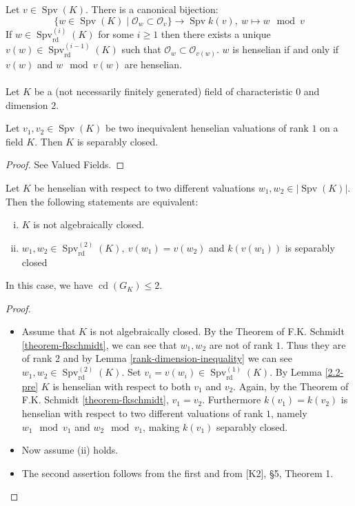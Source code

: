 \begin{lemma}\label{2.2-pre}
Let $v\in\operatorname{Spv}(K)$. There is a canonical bijection:
\[\{ w\in\operatorname{Spv}(K)\mid \mathcal{O}_w\subset\mathcal{O}_v \} \to \operatorname{Spv}k(v),\ w\mapsto w\mod v\]
If $w\in\operatorname{Spv}_\text{rd}^{(i)}(K)$ for some $i\geq 1$ then there exists a unique $v(w)\in\operatorname{Spv}_\text{rd}^{(i-1)}(K)$ such that $\mathcal{O}_w\subset\mathcal{O}_{v(w)}$. $w$ is henselian if and only if $v(w)$ and $w\mod v(w)$ are henselian.
\end{lemma}

\paragraph{} Let $K$ be a (not necessarily finitely generated) field of characteristic $0$ and dimension $2$.

\begin{theorem}\label{theorem-fkschmidt}
Let $v_1,v_2\in\operatorname{Spv}(K)$ be two inequivalent henselian valuations of rank $1$ on a field $K$. Then $K$ is separably closed.
\end{theorem}

\begin{proof}
See Valued Fields.
\end{proof}

\begin{lemma}\label{2.2}
Let $K$ be henselian with respect to two different valuations $w_1,w_2\in |\operatorname{Spv}(K)|$. Then the following statements are equivalent: 
\begin{enumerate}[(i)]
\item $K$ is not algebraically closed.
\item $w_1,w_2\in\operatorname{Spv}_\text{rd}^{(2)}(K),\ v(w_1)=v(w_2)$ and $k(v(w_1))$ is separably closed
\end{enumerate}
In this case, we have $\operatorname{cd}(G_K)\leq 2$.
\end{lemma}

\begin{proof}
\begin{itemize}
\item Assume that $K$ is not algebraically closed. By the Theorem of F.K. Schmidt \ref{theorem-fkschmidt}, we can see that $w_1,w_2$ are not of rank $1$. Thus they are of rank $2$ and by Lemma \ref{rank-dimension-inequality} we can see $w_1,w_2\in\operatorname{Spv}_\text{rd}^{(2)}(K)$. Set $v_i=v(w_i)\in\operatorname{Spv}^{(1)}_\text{rd}(K)$. By Lemma \ref{2.2-pre} $K$ is henselian with respect to both $v_1$ and $v_2$. Again, by the Theorem of F.K. Schmidt \ref{theorem-fkschmidt}, $v_1 = v_2$. Furthermore $k(v_1) = k(v_2)$ is henselian with respect to two different valuations of rank $1$, namely $w_1\mod v_1$ and $w_2\mod v_1$, making $k(v_1)$ separably closed.
\item Now assume (ii) holds.
\item The second assertion follows from the first and from [K2], §5, Theorem 1.\qedhere
\end{itemize}
\end{proof}

